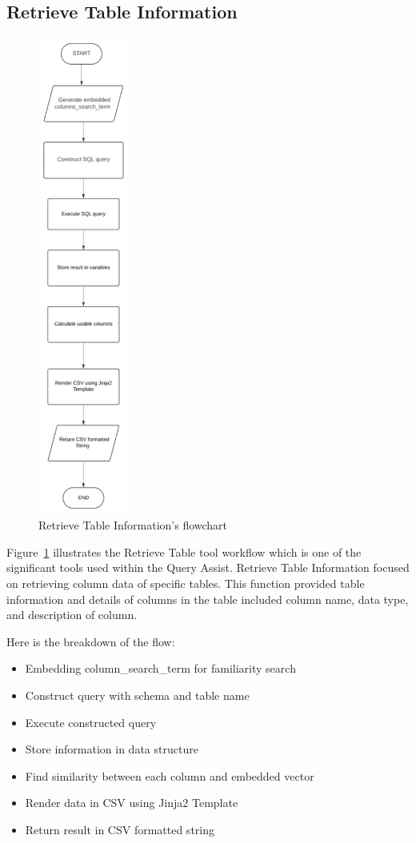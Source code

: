     \subsection{Retrieve Table Information}
    \begin{figure}[H]
        \centering
        \includegraphics[width=3cm]{chapters/3/figures/retrieve_table_info.png}
        \caption[Retrieve Table Information's flowchart]{Retrieve Table Information's flowchart}
        \label{fig:retrieve_table_info}
    \end{figure}
    Figure~\ref{fig:retrieve_table_info} illustrates the  Retrieve Table tool workflow which is one of the significant tools used within the Query Assist. Retrieve Table Information focused on retrieving column data of specific tables. This function provided table information and details of columns in the table included column name, data type, and description of column.

    Here is the breakdown of the flow:
    \begin{itemize}
        \item  Embedding column\_search\_term for familiarity search
        \item  Construct query with schema and table name
        \item  Execute constructed query
        \item  Store information in data structure
        \item  Find similarity between each column and embedded vector
        \item  Render data in CSV using Jinja2 Template
        \item  Return result in CSV formatted string
    \end{itemize}

